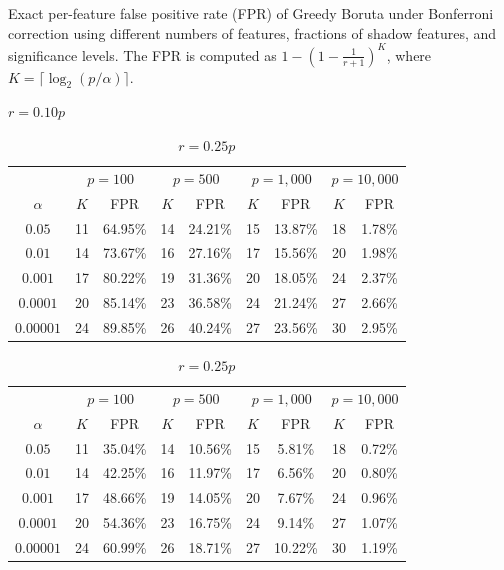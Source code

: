 \documentclass[runningheads]{llncs}
\begin{document}
\begin{table}[H]
\centering
\caption{Exact per-feature false positive rate (FPR) of Greedy Boruta under Bonferroni correction using different numbers of features, fractions of shadow features, and significance levels. The FPR is computed as $1-(1-\frac{1}{r+1})^K$, where $K=\lceil \log_2(p/\alpha)\rceil$.}
\label{tab:fpr_shadows_exact}

\begin{subtable}{\textwidth}
\centering
\caption{$r = 0.10p$}
\begin{tabular}{c|cc|cc|cc|cc}
\toprule
& \multicolumn{2}{c|}{$p = 100$}
& \multicolumn{2}{c|}{$p = 500$}
& \multicolumn{2}{c|}{$p = 1{,}000$}
& \multicolumn{2}{c}{$p = 10{,}000$} \\
$\alpha$
& $K$ & FPR
& $K$ & FPR
& $K$ & FPR
& $K$ & FPR \\
\midrule
$0.05$    & 11 & 64.95\% & 14 & 24.21\% & 15 & 13.87\% & 18 & 1.78\% \\
$0.01$    & 14 & 73.67\% & 16 & 27.16\% & 17 & 15.56\% & 20 & 1.98\% \\
$0.001$   & 17 & 80.22\% & 19 & 31.36\% & 20 & 18.05\% & 24 & 2.37\% \\
$0.0001$  & 20 & 85.14\% & 23 & 36.58\% & 24 & 21.24\% & 27 & 2.66\% \\
$0.00001$ & 24 & 89.85\% & 26 & 40.24\% & 27 & 23.56\% & 30 & 2.95\% \\
\bottomrule
\end{tabular}
\end{subtable}


\begin{subtable}{\textwidth}
\centering
\caption{$r = 0.25p$}
\begin{tabular}{c|cc|cc|cc|cc}
\toprule
& \multicolumn{2}{c|}{$p = 100$}
& \multicolumn{2}{c|}{$p = 500$}
& \multicolumn{2}{c|}{$p = 1{,}000$}
& \multicolumn{2}{c}{$p = 10{,}000$} \\
$\alpha$
& $K$ & FPR
& $K$ & FPR
& $K$ & FPR
& $K$ & FPR \\
\midrule
$0.05$    & 11 & 35.04\% & 14 & 10.56\% & 15 & 5.81\% & 18 & 0.72\% \\
$0.01$    & 14 & 42.25\% & 16 & 11.97\% & 17 & 6.56\% & 20 & 0.80\% \\
$0.001$   & 17 & 48.66\% & 19 & 14.05\% & 20 & 7.67\% & 24 & 0.96\% \\
$0.0001$  & 20 & 54.36\% & 23 & 16.75\% & 24 & 9.14\% & 27 & 1.07\% \\
$0.00001$ & 24 & 60.99\% & 26 & 18.71\% & 27 & 10.22\% & 30 & 1.19\% \\
\bottomrule
\end{tabular}
\end{subtable}


\end{table}
\end{document}
